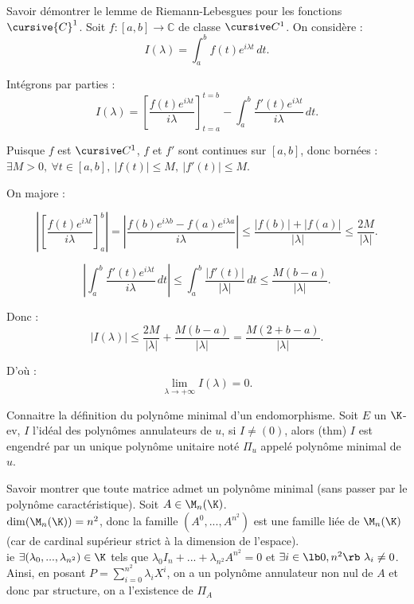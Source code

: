 \documentclass[french, 11pt]{article}
\begin{document}
\begin{exercice}{}{}
    Savoir démontrer le lemme de Riemann-Lebesgues pour les fonctions $\cursive{C}^1$.
    \tcblower
    Soit \(f : [a,b] \to \mathbb{C}\) de classe \(\cursive C^1\). On considère :
    \[
    I(\lambda) = \int_a^b f(t) e^{i\lambda t} \, dt.
    \]

    Intégrons par parties :
    \[
    I(\lambda) = \left[ \frac{f(t) e^{i\lambda t}}{i\lambda} \right]_{t=a}^{t=b} 
    - \int_a^b \frac{f'(t) e^{i\lambda t}}{i\lambda} \, dt.
    \]

    Puisque \(f\) est \(\cursive C^1\), \(f\) et \(f'\) sont continues sur \([a,b]\), donc bornées : 
    \(\exists M > 0, \ \forall t \in [a,b], \ |f(t)| \le M,\ |f'(t)| \le M\).

    On majore :

    \[
    \left| \left[ \frac{f(t) e^{i\lambda t}}{i\lambda} \right]_a^b \right| 
    = \left| \frac{f(b)e^{i\lambda b} - f(a)e^{i\lambda a}}{i\lambda} \right| 
    \le \frac{|f(b)| + |f(a)|}{|\lambda|} 
    \le \frac{2M}{|\lambda|}.
    \]

    \[
    \left| \int_a^b \frac{f'(t) e^{i\lambda t}}{i\lambda} \, dt \right| 
    \le \int_a^b \frac{|f'(t)|}{|\lambda|} \, dt 
    \le \frac{M(b-a)}{|\lambda|}.
    \]

    Donc :
    \[
    |I(\lambda)| \le \frac{2M}{|\lambda|} + \frac{M(b-a)}{|\lambda|}
    = \frac{M(2 + b-a)}{|\lambda|}.
    \]

    D’où :
    \[
    \boxed{\lim_{\lambda \to +\infty} I(\lambda) = 0}.
    \]
\end{exercice}

\begin{exercice}{}{}
    Connaitre la définition du polynôme minimal d'un endomorphisme.
    \tcblower
    Soit $E$ un $\K$-ev, $I$ l'idéal des polynômes annulateurs de $u$, si $I\neq(0)$, alors (thm) $I$ est engendré par un unique polynôme unitaire noté $\Pi_u$ appelé polynôme minimal de $u$.
\end{exercice}

\begin{exercice}{}{}
    Savoir montrer que toute matrice admet un polynôme minimal (sans passer par le polynôme caractéristique).
    \tcblower
    Soit $A \in \M_n(\K)$.\\ 
    $\dim(\M_n(\K)) = n^2$, donc la famille $(A^0, ..., A^{n^2})$ est une famille liée de $\M_n(\K)$ (car de cardinal supérieur strict à la dimension de l'espace).\\
    ie $\exists (\lambda_0, ..., \lambda_{n^2}) \in \K$ tels que $\lambda_0 I_n + ... + \lambda_{n^2}A^{n^2} = 0$ et $\exists i \in \lb 0, n^2 \rb ~ \lambda_i \ne 0$.\\
    Ainsi, en posant $P = \sum_{i = 0}^{n^2} \lambda_iX^i$, on a un polynôme annulateur non nul de $A$ et donc par structure, on a l'existence de $\Pi_A$
\end{exercice}
\end{document}
